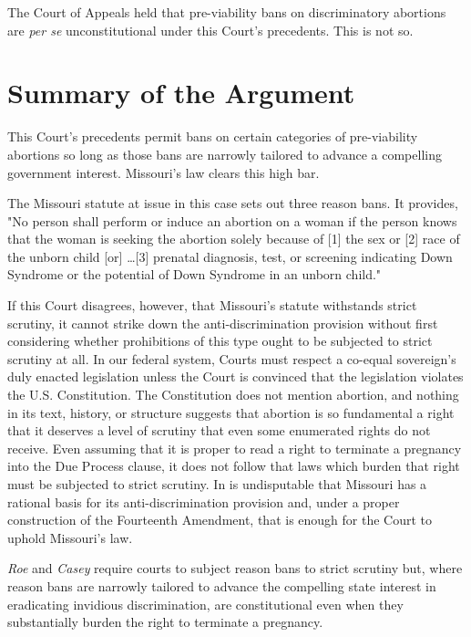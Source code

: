 \documentclass[12pt,\documentclassflag]{SCOTUS_Brief}
\begin{document}
The Court of Appeals held that pre-viability bans on discriminatory abortions are \textit{per se} unconstitutional under this Court's precedents. This is not so.

\section{Summary of the Argument}

This Court's precedents permit bans on certain categories of pre-viability abortions so long as those bans are narrowly tailored to advance a compelling government interest. Missouri's law clears this high bar.

The Missouri statute at issue in this case sets out three reason bans. It provides, "No person shall perform or induce an abortion on a woman if the person knows that the woman is seeking the abortion solely because of [1] the sex or [2] race of the unborn child [or] \ldots  [3] prenatal diagnosis, test, or screening indicating Down Syndrome or the potential of Down Syndrome in an unborn child." 

If this Court disagrees, however, that Missouri's statute withstands strict scrutiny, it cannot strike down the anti-discrimination provision without first considering whether prohibitions of this type ought to be subjected to strict scrutiny at all. In our federal system, Courts must respect a co-equal sovereign's duly enacted legislation unless the Court is convinced that the legislation violates the U.S. Constitution. The Constitution does not mention abortion, and nothing in its text, history, or structure suggests that abortion is so fundamental a right that it deserves a level of scrutiny that even some enumerated rights do not receive. Even assuming that it is proper to read a right to terminate a pregnancy into the Due Process clause, it does not follow that laws which burden that right must be subjected to strict scrutiny. In is undisputable that Missouri has a rational basis for its anti-discrimination provision and, under a proper construction of the Fourteenth Amendment, that is enough for the Court to uphold Missouri's law.

\textit{Roe} and \textit{Casey} \cite[!]{Casey} require courts to subject reason bans to strict scrutiny but, where reason bans are narrowly tailored to advance the compelling state interest in eradicating invidious discrimination, are constitutional even when they substantially burden the right to terminate a pregnancy.
\end{document}

